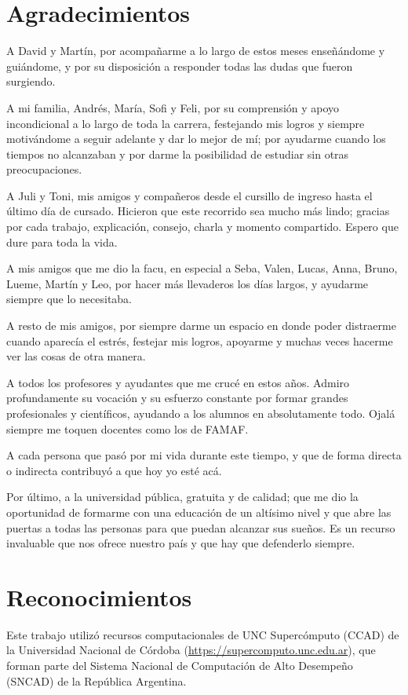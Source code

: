 \documentclass[a4paper,12pt,spanish]{book}
\begin{document}

\cleardoublepage


\clearpage

\thispagestyle{empty}
\chapter*{Agradecimientos}
A David y Martín, por acompañarme a lo largo de estos meses enseñándome y guiándome,
y por su disposición a responder todas las dudas que fueron surgiendo.

A mi familia, Andrés, María, Sofi y Feli, por su comprensión y apoyo incondicional a lo
largo de toda la carrera, festejando mis logros y siempre motivándome a seguir adelante y
dar lo mejor de mí; por ayudarme cuando los tiempos no alcanzaban y por darme la
posibilidad de estudiar sin otras preocupaciones.

A Juli y Toni, mis amigos y compañeros desde el cursillo de ingreso hasta el último día de
cursado. Hicieron que este recorrido sea mucho más lindo; gracias por cada trabajo,
explicación, consejo, charla y momento compartido. Espero que dure para toda la vida.

A mis amigos que me dio la facu, en especial a Seba, Valen, Lucas, Anna, Bruno,
Lueme, Martín y Leo, por hacer más llevaderos los días largos, y ayudarme siempre que
lo necesitaba.

A resto de mis amigos, por siempre darme un espacio en donde poder distraerme cuando
aparecía el estrés, festejar mis logros, apoyarme y muchas veces hacerme ver las cosas de
otra manera.

A todos los profesores y ayudantes que me crucé en estos años. Admiro profundamente su
vocación y su esfuerzo constante por formar grandes profesionales y científicos, ayudando
a los alumnos en absolutamente todo. Ojalá siempre me toquen docentes como los de FAMAF.

A cada persona que pasó por mi vida durante este tiempo, y que de forma directa
o indirecta contribuyó a que hoy yo esté acá.

Por último, a la universidad pública, gratuita y de calidad; que me dio la oportunidad de
formarme con una educación de un altísimo nivel y que abre las puertas a todas las
personas para que puedan alcanzar sus sueños. Es un recurso invaluable que nos ofrece
nuestro país y que hay que defenderlo siempre.
\clearpage

\thispagestyle{empty}
\chapter*{Reconocimientos}
Este trabajo utilizó recursos computacionales de UNC Supercómputo (CCAD) de la Universidad
Nacional de Córdoba
({\href{https://supercomputo.unc.edu.ar}{https://supercomputo.unc.edu.ar}}), que forman
parte del Sistema Nacional de Computación de Alto Desempeño (SNCAD) de la República
Argentina.
\end{document}
